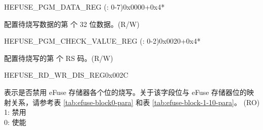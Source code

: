 \begin{register}{H}{EFUSE\_PGM\_DATA\_REG (: 0-7)}{0x0000+0x4*}\label{regdesc:EFUSEPGMDATANREG}
%
\regnewline%
\begin{regdesc}\begin{reglist}
\label{fielddesc:EFUSEPGMDATAN}\item [EFUSE\_PGM\_DATA\_\regindex{n}] 配置待烧写数据的第  个 32 位数据。(R/W)
\end{reglist}\end{regdesc}
\end{register}


\begin{register}{H}{EFUSE\_PGM\_CHECK\_VALUE\_REG (: 0-2)}{0x0020+0x4*}\label{regdesc:EFUSEPGMCHECKVALUENREG}
%
\regnewline%
\begin{regdesc}\begin{reglist}
\label{fielddesc:EFUSEPGMRSDATAN}\item [EFUSE\_PGM\_RS\_DATA\_\regindex{n}] 配置待烧写的第  个 RS 码。(R/W)
\end{reglist}\end{regdesc}
\end{register}


\begin{register}{H}{EFUSE\_RD\_WR\_DIS\_REG}{0x002C}\label{regdesc:EFUSERDWRDISREG}
%
\regnewline%
\begin{regdesc}\begin{reglist}
\label{fielddesc:EFUSEWRDIS}\item [EFUSE\_WR\_DIS] 表示是否禁用 eFuse 存储器各个位的烧写。关于该字段位与 eFuse 存储器位的映射关系，请参考表 \ref{tab:efuse-block0-para} 和表 \ref{tab:efuse-block-1-10-para}。 (RO)\\1: 禁用\\0: 使能
\end{reglist}\end{regdesc}
\end{register}


